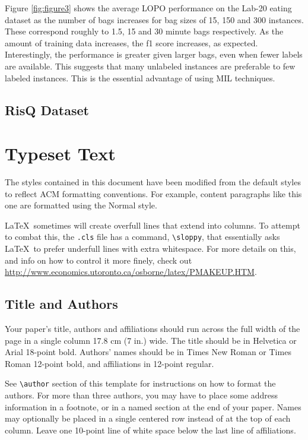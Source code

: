\documentclass{sigchi}
\begin{document}
Figure \ref{fig:figure3} shows the average LOPO performance on the Lab-20 eating dataset as the number of bags increases for bag sizes of 15, 150 and 300 instances. These correspond roughly to 1.5, 15 and 30 minute bags respectively. As the amount of training data increases, the f1 score increases, as expected. Interestingly, the performance is greater given larger bags, even when fewer labels are available. This suggests that many unlabeled instances are preferable to few labeled instances. This is the essential advantage of using MIL techniques.



\subsection{RisQ Dataset}


\section{Typeset Text}
The styles contained in this document have been modified from the
default styles to reflect ACM formatting conventions. For example,
content paragraphs like this one are formatted using the Normal style.

\LaTeX\ sometimes will create overfull lines that extend into columns.
To attempt to combat this, the \texttt{.cls} file has a command,
\texttt{{\textbackslash}sloppy}, that essentially asks \LaTeX\ to
prefer underfull lines with extra whitespace.  For more details on
this, and info on how to control it more finely, check out
{\url{http://www.economics.utoronto.ca/osborne/latex/PMAKEUP.HTM}}.

\subsection{Title and Authors}

Your paper's title, authors and affiliations should run across the
full width of the page in a single column 17.8 cm (7 in.) wide.  The
title should be in Helvetica or Arial 18-point bold.  Authors' names
should be in Times New Roman or Times Roman 12-point bold, and
affiliations in 12-point regular.  

See \texttt{{\textbackslash}author} section of this template for
instructions on how to format the authors. For more than three
authors, you may have to place some address information in a footnote,
or in a named section at the end of your paper. Names may optionally
be placed in a single centered row instead of at the top of each
column. Leave one 10-point line of white space below the last line of
affiliations.
\end{document}
